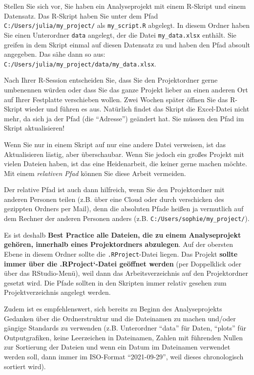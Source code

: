 \documentclass[
]{book}
\begin{document}
Stellen Sie sich vor, Sie haben ein Analyseprojekt mit einem R-Skript und einem Datensatz. Das R-Skript haben Sie unter dem Pfad \texttt{C:/Users/julia/my\_project/} als \texttt{my\_script.R} abgelegt. In diesem Ordner haben Sie einen Unterordner \texttt{data} angelegt, der die Datei \texttt{my\_data.xlsx} enthält. Sie greifen in dem Skript einmal auf diesen Datensatz zu und haben den Pfad absoult angegeben. Das sähe dann so aus: \texttt{C:/Users/julia/my\_project/data/my\_data.xlsx}.

Nach Ihrer R-Session entscheiden Sie, dass Sie den Projektordner gerne umbenennen würden oder dass Sie das ganze Projekt lieber an einen anderen Ort auf Ihrer Festplatte verschieben wollen. Zwei Wochen später öffnen Sie das R-Skript wieder und führen es aus. Natürlich findet das Skript die Excel-Datei nicht mehr, da sich ja der Pfad (die ``Adresse'') geändert hat. Sie müssen den Pfad im Skript aktualisieren!

Wenn Sie nur in einem Skript auf nur eine andere Datei verweisen, ist das Aktualisieren lästig, aber überschaubar. Wenn Sie jedoch ein großes Projekt mit vielen Dateien haben, ist das eine Heidenarbeit, die keiner gerne machen möchte. Mit einem \emph{relativen Pfad} können Sie diese Arbeit vermeiden.

Der relative Pfad ist auch dann hilfreich, wenn Sie den Projektordner mit anderen Personen teilen (z.B. über eine Cloud oder durch verschicken des gezippten Ordners per Mail), denn die absoluten Pfade heißen ja vermutlich auf dem Rechner der anderen Personen anders (z.B. \texttt{C:/Users/sophie/my\_project/}).

Es ist deshalb \textbf{Best Practice alle Dateien, die zu einem Analyseprojekt gehören, innerhalb eines Projektordners abzulegen}. Auf der obersten Ebene in diesem Ordner sollte die \texttt{.RProject}-Datei liegen. Das Projekt \textbf{sollte immer über die .RProject`-Datei geöffnet werden} (per Doppelklick oder über das RStudio-Menü), weil dann das Arbeitsverzeichnis auf den Projektordner gesetzt wird. Die Pfade sollten in den Skripten immer relativ gesehen zum Projektverzeichnis angelegt werden.

Zudem ist es empfehlenswert, sich bereits zu Beginn des Analyseprojekts Gedanken über die Ordnerstruktur und die Dateinamen zu machen und/oder gängige Standards zu verwenden (z.B. Unterordner ``data'' für Daten, ``plots'' für Outputgrafiken, keine Leerzeichen in Dateinamen, Zahlen mit führenden Nullen zur Sortierung der Dateien und wenn ein Datum im Dateinamen verwendet werden soll, dann immer im ISO-Format ``2021-09-29'', weil dieses chronologisch sortiert wird).
\end{document}
